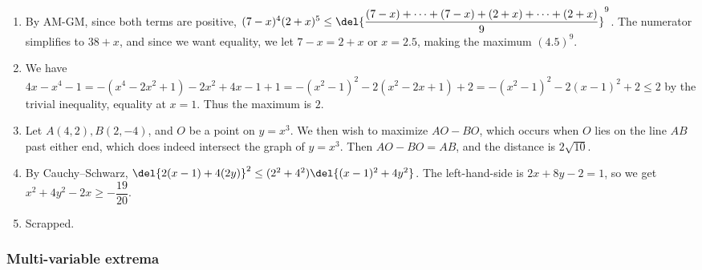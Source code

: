 \documentclass[10pt,paper=letter]{scrartcl}
\begin{document}
\begin{enumerate}

\item By AM-GM, since both terms are positive, $(7-x)^4(2+x)^5 \leq \del{\dfrac{(7-x)+\cdots+(7-x)+(2+x)+\cdots+(2+x)}9}^9$. The numerator simplifies to $38 + x$, and since we want equality, we let $7-x = 2+x$ or $x = 2.5$, making the maximum $(4.5)^9$.

\item We have $4x - x^4 - 1 = -(x^4 - 2x^2 + 1) - 2x^2 + 4x - 1 + 1 = -(x^2 - 1)^2 - 2(x^2 - 2x + 1) + 2 = -(x^2 - 1)^2 - 2(x - 1)^2 + 2 \leq 2$ by the trivial inequality, equality at $x = 1$. Thus the maximum is $2$.

\item Let $A(4, 2), B(2, -4)$, and $O$ be a point on $y = x^3$. We then wish to maximize $AO - BO$, which occurs when $O$ lies on the line $AB$ past either end, which does indeed intersect the graph of $y = x^3$. Then $AO - BO = AB$, and the distance is $2\sqrt{10}$.

\item By Cauchy--Schwarz, $\del{2(x-1) + 4(2y)}^2 \leq (2^2 + 4^2)\del{(x-1)^2 + 4y^2}$. The left-hand-side is $2x + 8y - 2 = 1$, so we get $x^2 + 4y^2 - 2x \geq -\dfrac{19}{20}$.

\item Scrapped.

\end{enumerate}

\subsubsection*{Multi-variable extrema}
\end{document}
